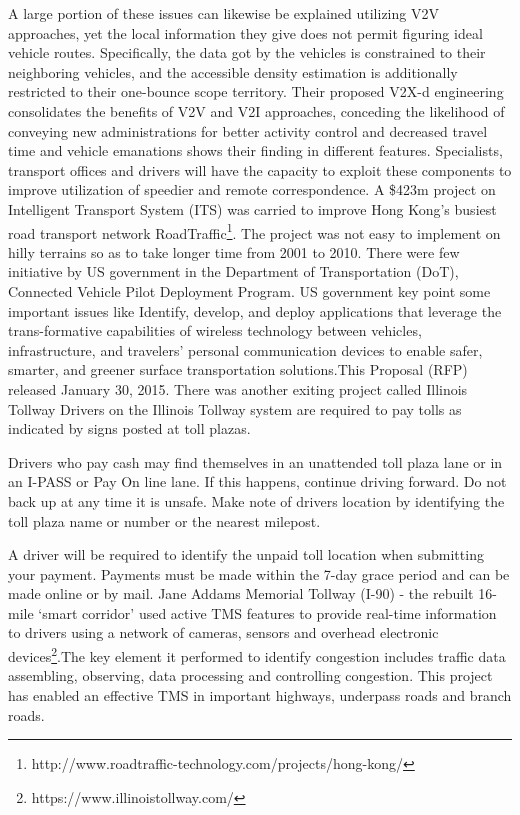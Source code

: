 \documentclass[conference]{IEEEtran}
\begin{document}
A large portion of these issues can likewise be explained utilizing V2V approaches, yet the local information they give does not permit figuring ideal vehicle routes. Specifically, the data got by the vehicles is constrained to their neighboring vehicles, and the accessible density estimation is additionally restricted to their one-bounce scope territory. Their proposed V2X-d engineering consolidates the benefits of V2V and V2I approaches, conceding the likelihood of conveying new administrations for better activity control and decreased travel time and vehicle emanations \label{tab:density} shows their finding in different features. Specialists, transport offices and drivers will have the capacity to exploit these components to improve utilization of speedier and remote correspondence. A \$423m project on Intelligent Transport System (ITS) was carried to improve Hong Kong's busiest road transport network RoadTraffic\footnote{http://www.roadtraffic-technology.com/projects/hong-kong/}. The project was not easy to implement on hilly terrains so as to take longer time from 2001 to 2010. There were few initiative by US government in the Department of Transportation (DoT), Connected Vehicle Pilot Deployment Program. US government key point some important issues like Identify, develop, and deploy applications that leverage the trans-formative capabilities of wireless technology between
vehicles, infrastructure, and travelers’ personal communication devices to enable safer, smarter, and greener surface transportation solutions.This Proposal (RFP) released January 30, 2015. There was another exiting project called Illinois Tollway Drivers on the Illinois Tollway system are required to pay tolls as indicated by signs posted at toll plazas.

Drivers who pay cash may find themselves in an unattended toll plaza lane or in an I-PASS or Pay On line lane. If this happens, continue driving forward. Do not back up at any time it is unsafe. Make note of drivers location by identifying the toll plaza name or number or the nearest milepost. 

A driver will be required to identify the unpaid toll location when submitting your payment. Payments must be made within the 7-day grace period and can be made online or by mail. Jane Addams Memorial Tollway (I-90) - the rebuilt 16-mile ‘smart corridor’ used active TMS features to provide real-time information to drivers using a network of cameras, sensors and overhead electronic devices\footnote{https://www.illinoistollway.com/}.The key element it performed to identify congestion includes traffic data assembling, observing, data processing and controlling congestion. This project has enabled an effective TMS in important highways, underpass roads and branch roads.
\end{document}
